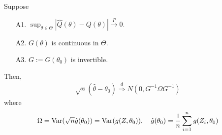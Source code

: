 \documentclass[11pt]{elegantbook}
\begin{document}
\begin{theorem}\label{thm:asymptotic_normality_of_m_estimators}
    Suppose
    \begin{enumerate}
        \item[A1.] $\sup_{\theta\in\Theta}|\hat{Q}(\theta)-Q(\theta)| \stackrel{P}{\longrightarrow} 0$.
        \item[A2.] $G(\theta)$ is continuous in $\Theta$.
        \item[A3.] $G:=G(\theta_0)$ is invertible.
    \end{enumerate}
    Then,
    \begin{equation}
        \begin{aligned}
            \sqrt{n}\left(\hat{\theta}-\theta_0\right) \stackrel{d}{\Rightarrow} N\left(0,G^{-1}\Omega G^{-1}\right)
        \end{aligned}
        \nonumber
    \end{equation}
    where
    \begin{equation}
        \begin{aligned}
            \Omega=\textnormal{Var}(\sqrt{n}\hat{g}(\theta_0))=\textnormal{Var}(g(Z,\theta_0)), \quad \hat{g}(\theta_0)=\frac{1}{n}\sum_{i=1}^n g(Z_i,\theta_0)
        \end{aligned}
        \nonumber
    \end{equation}
\end{theorem}
\end{document}
